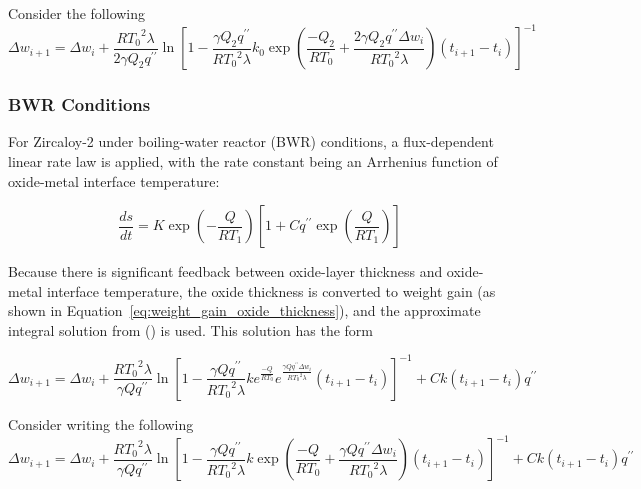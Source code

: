 {\color{red}Consider the following}
\begin{equation}
    \label{eq:weight_gain_above_transition_thickness_ZIRLO_OptZIRLO}
    \Delta w_{i + 1} = \Delta w_{i} + \frac{R{T_{0}}^{2}\lambda}{2\gamma Q_{2}q^{\prime \prime}}{\ln\left\lbrack 1 - \frac{\gamma Q_{2}q^{\prime \prime}}{R{T_{0}}^{2}\lambda}k_{0}\exp \left( \frac{- Q_{2}}{RT_{0}} + \frac{2\gamma Q_{2}q^{\prime \prime}\Delta w_{i}}{R{T_{0}}^{2}\lambda}\right) \left( t_{i + 1} - t_{i} \right) \right\rbrack}^{- 1}
\end{equation}

\subsubsection{BWR Conditions}\label{section:bwr-conditions}

For Zircaloy-2 under boiling-water reactor (BWR) conditions, a flux-dependent linear rate law is
applied, with the rate constant being an Arrhenius function of oxide-metal interface temperature:

\begin{equation}
    \label{eq:Zirc2_ds_dt}
    \frac{ds}{dt} = K\exp\left( - \frac{Q}{RT_{1}} \right) \left\lbrack 1 + Cq^{\prime \prime }\exp \left( \frac{Q}{RT_{1}} \right) \right\rbrack
\end{equation}

Because there is significant feedback between oxide-layer thickness and oxide-metal interface
temperature, the oxide thickness is converted to weight gain (as shown in
Equation~\ref{eq:weight_gain_oxide_thickness}), and the approximate integral solution from
(\cite{ref:Garzarolli1982}) is used. This solution has the form

\begin{equation}
    \label{eq:Zirc2_weight_gain}
    \Delta w_{i + 1} = \Delta w_{i} + \frac{R{T_{0}}^{2}\lambda}{\gamma Q q^{\prime \prime}}{\ln\left\lbrack 1 - \frac{\gamma Q q^{\prime \prime}}{R{T_{0}}^{2}\lambda}ke^{\frac{- Q}{RT_{0}}}e^{\frac{\gamma Q q^{\prime \prime}\Delta w_{i}}{R{T_{0}}^{2}\lambda}}\left( t_{i + 1} - t_{i} \right) \right\rbrack}^{- 1} + Ck\left( t_{i + 1} - t_{i} \right)q^{\prime \prime}
\end{equation}

{\color{red}Consider writing the following}
\begin{equation}
    \label{eq:Zirc2_weight_gain}
    \Delta w_{i + 1} = \Delta w_{i} + \frac{R{T_{0}}^{2}\lambda}{\gamma Q q^{\prime \prime}}{\ln\left\lbrack 1 - \frac{\gamma Q q^{\prime \prime}}{R{T_{0}}^{2}\lambda}k \exp \left(\frac{- Q}{RT_{0}} + \frac{\gamma Q q^{\prime \prime}\Delta w_{i}}{R{T_{0}}^{2}\lambda}\right) \left( t_{i + 1} - t_{i} \right) \right\rbrack}^{- 1} + Ck\left( t_{i + 1} - t_{i} \right)q^{\prime \prime}
\end{equation}

